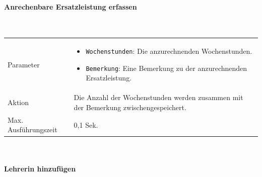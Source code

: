 \documentclass[fontsize=12pt,paper=a4,twoside]{scrartcl}
\begin{document}
\paragraph{Anrechenbare Ersatzleistung erfassen}\mbox{}\\

\begin{tabularx}{\textwidth}{p{4cm}X}
Parameter & \begin{itemize}[itemsep=0pt, leftmargin = 0.5cm]
			\item \texttt{Wochenstunden}: Die anzurechnenden Wochenstunden.
			\item \texttt{Bemerkung}: Eine Bemerkung zu der anzurechnenden Ersatzleistung.
			\end{itemize}\\
Aktion & Die Anzahl der Wochenstunden werden zusammen mit der Bemerkung  zwischengespeichert.\\
Max. Ausführungszeit & 0,1 Sek. 
\end{tabularx}\\


\paragraph{Lehrerin hinzufügen}\mbox{}\\
\end{document}
